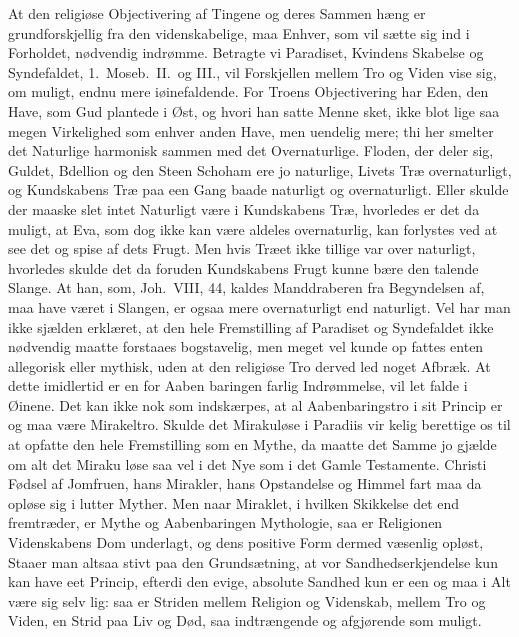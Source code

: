 \documentclass[12pt,a4paper]{article}
\newcommand{\opage}[1]{\marginnote{\footnotesize\textit{[#1]}}}
\begin{document}
At den religiøse Objectivering af Tingene og deres Sammen\-%
hæng er grundforskjellig fra den videnskabelige, maa Enhver, som
vil sætte sig ind i Forholdet, nødvendig indrømme. Betragte vi
Paradiset, Kvindens Skabelse og Syndefaldet, 1.\ Moseb.\ II.\ og III.,
\opage{11}vil Forskjellen mellem Tro og Viden vise sig, om muligt,
endnu mere iøinefaldende. For Troens Objectivering har Eden,
den Have, som Gud plantede i Øst, og hvori han satte Menne\-%
sket, ikke blot lige saa megen Virkelighed som enhver anden Have,
men uendelig mere; thi her smelter det Naturlige harmonisk
sammen med det Overnaturlige. Floden, der deler sig, Guldet,
Bdellion og den Steen Schoham ere jo naturlige, Livets Træ
overnaturligt, og Kundskabens Træ paa een Gang baade naturligt
og overnaturligt. Eller skulde der maaske slet intet Naturligt
være i Kundskabens Træ, hvorledes er det da muligt, at Eva, som
dog ikke kan være aldeles overnaturlig, kan forlystes ved at see
det og spise af dets Frugt. Men hvis Træet ikke tillige var over\-%
naturligt, hvorledes skulde det da foruden Kundskabens Frugt
kunne bære den talende Slange. At han, som, Joh.\ VIII, 44, kaldes
Manddraberen fra Begyndelsen af, maa have været i Slangen, er
ogsaa mere overnaturligt end naturligt. Vel har man ikke sjælden
erklæret, at den hele Fremstilling af Paradiset og Syndefaldet ikke
nødvendig maatte forstaaes bogstavelig, men meget vel kunde op\-%
fattes enten allegorisk eller mythisk, uden at den religiøse Tro
derved led noget Afbræk. At dette imidlertid er en for Aaben\-%
baringen farlig Indrømmelse, vil let falde i Øinene. Det kan
ikke nok som indskærpes, at al Aabenbaringstro i sit Princip er
og maa være Mirakeltro. Skulde det Mirakuløse i Paradiis vir\-%
kelig berettige os til at opfatte den hele Fremstilling som en
Mythe, da maatte det Samme jo gjælde om alt det Miraku\-%
løse saa vel i det Nye som i det Gamle Testamente. Christi
Fødsel af Jomfruen, hans Mirakler, hans Opstandelse og Himmel\-%
fart maa da opløse sig i lutter Myther. Men naar Miraklet, i
hvilken Skikkelse det end fremtræder, er Mythe og Aabenbaringen
Mythologie, saa er Religionen Videnskabens Dom underlagt, og
dens positive Form dermed væsenlig opløst, Staaer man altsaa
stivt paa den Grundsætning, at vor Sandhedserkjendelse kun kan
have eet Princip, efterdi den evige, absolute Sandhed kun er een
og maa i Alt være sig selv lig: saa er Striden mellem Religion
\opage{12}og Videnskab, mellem Tro og Viden, en Strid paa Liv og Død,
saa indtrængende og afgjørende som muligt.
\end{document}
